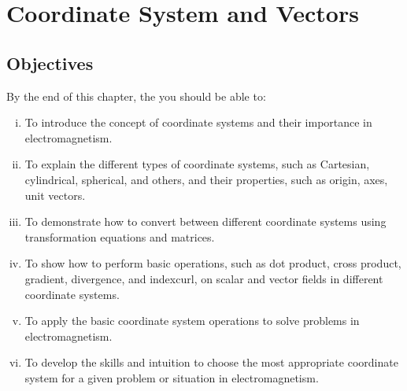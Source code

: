 \chapter{Coordinate System and Vectors}\label{lec:lec16}

\begin{mdframed}[ backgroundcolor=lightblue, linewidth=1pt, hidealllines=true]
\section{Objectives}
By the end of this chapter, the you should be able to:
\begin{enumerate}[(i)]
\item   To introduce the concept of coordinate systems and their importance in electromagnetism. 
\item To explain the different types of coordinate systems, such as Cartesian, cylindrical, spherical, and others, and their properties, such as origin, axes, unit vectors.
\item To demonstrate how to convert between different coordinate systems using transformation equations and matrices.
\item To show how to perform basic operations, such as dot product, cross product, gradient, divergence, and index{curl}, on scalar and vector fields in different coordinate systems. 
\item To apply the basic  coordinate system operations to solve problems in electromagnetism.
\item To develop the skills and intuition to choose the most appropriate coordinate system for a given problem or situation in electromagnetism. 	
\end{enumerate}
\end{mdframed}

